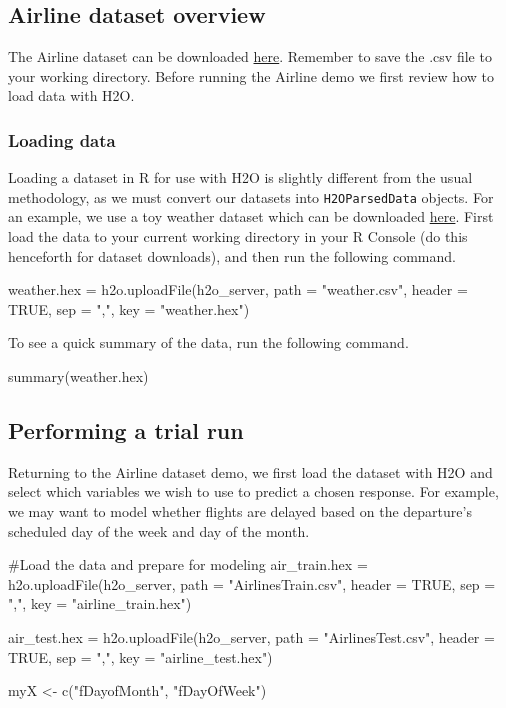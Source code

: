 \documentclass[11pt]{article}
\begin{document}
\subsection{Airline dataset overview} \label{3.1}

The Airline dataset can be downloaded \href{https://github.com/0xdata/h2o/blob/master/smalldata/airlines/allyears2k_headers.zip}{here}. Remember to save the .csv file to your working directory. Before running the Airline demo we first review how to load data with H2O. 

\subsubsection{Loading data} \label{2.5}

Loading a dataset in R for use with H2O is slightly different from the usual methodology, as we must convert our datasets into \texttt{H2OParsedData} objects. For an example, we use a toy weather dataset which can be downloaded \href{https://raw.githubusercontent.com/0xdata/h2o/master/smalldata/weather.csv}{here}. First load the data to your current working directory in your R Console (do this henceforth for dataset downloads), and then run the following command.
\begin{spverbatim}
weather.hex = h2o.uploadFile(h2o_server, path = "weather.csv", header = TRUE, sep = ",", key = "weather.hex")
\end{spverbatim}
\bigskip
\noindent
To see a quick summary of the data, run the following command.
\begin{spverbatim}
summary(weather.hex)
\end{spverbatim}


\subsection{Performing a trial run} \label{3.2}
Returning to the Airline dataset demo, we first load the dataset with H2O and select which variables we wish to use to predict a chosen response. For example, we may want to model whether flights are delayed based on the departure's scheduled day of the week and day of the month.
\begin{spverbatim}

#Load the data and prepare for modeling
air_train.hex = h2o.uploadFile(h2o_server, path = "AirlinesTrain.csv", header = TRUE, sep = ",", key = "airline_train.hex")

air_test.hex = h2o.uploadFile(h2o_server, path = "AirlinesTest.csv", header = TRUE, sep = ",", key = "airline_test.hex")

myX <- c("fDayofMonth", "fDayOfWeek")

\end{spverbatim}
\end{document}
